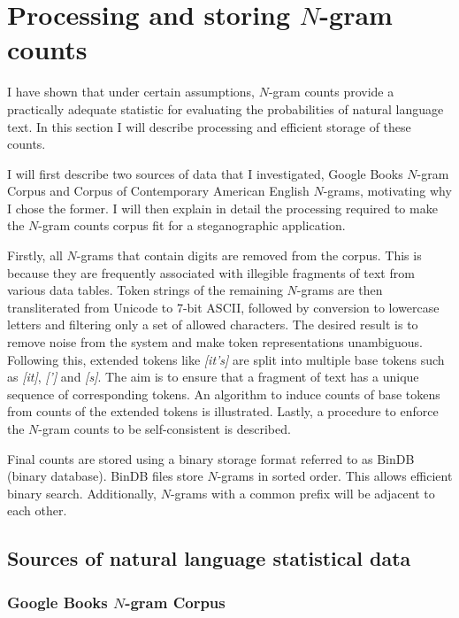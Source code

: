\documentclass[draft]{IIBproject}
\DeclareRobustCommand{\ngram}[1]{\emph{[#1]}}
\begin{document}
\clearpage
\section{Processing and storing $N$-gram counts}

I have shown that under certain assumptions, $N$-gram counts provide a practically adequate statistic for evaluating the probabilities of natural language text. In this section I will describe processing and efficient storage of these counts.

I will first describe two sources of data that I investigated, Google Books $N$-gram Corpus and Corpus of Contemporary American English $N$-grams, motivating why I chose the former. I will then explain in detail the processing required to make the $N$-gram counts corpus fit for a steganographic application.

Firstly, all $N$-grams that contain digits are removed from the corpus. This is because they are frequently associated with illegible fragments of text from various data tables. Token strings of the remaining $N$-grams are then transliterated from Unicode to 7-bit ASCII, followed by conversion to lowercase letters and filtering only a set of allowed characters. The desired result is to remove noise from the system and make token representations unambiguous. Following this, extended tokens like \ngram{it's} are split into multiple base tokens such as \ngram{it}, \ngram{'} and \ngram{s}. The aim is to ensure that a fragment of text has a unique sequence of corresponding tokens. An algorithm to induce counts of base tokens from counts of the extended tokens is illustrated. Lastly, a procedure to enforce the $N$-gram counts to be self-consistent is described.

Final counts are stored using a binary storage format referred to as BinDB (binary database). BinDB files store $N$-grams in sorted order. This allows efficient binary search. Additionally, $N$-grams with a common prefix will be adjacent to each other.

\FloatBarrier
\subsection{Sources of natural language statistical data}

\subsubsection{Google Books $N$-gram Corpus}
\end{document}
